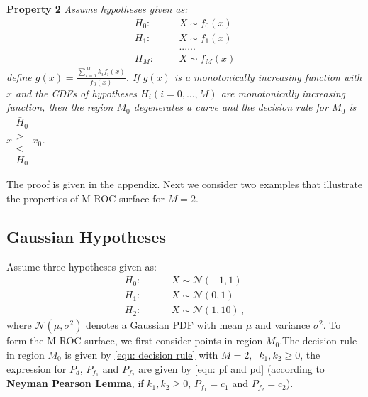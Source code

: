 \documentclass[12pt,journal,a4paper,twoside,doublecolumn]{IEEEtran}
\begin{document}
\begin{spacing}{1.0}
\noindent \textbf{Property 2}
\noindent \textit{
  \noindent Assume hypotheses given as:
}
\begin{equation}
\begin{split}
H_0:\;\;\;\;\;\;&X \sim f_0(x)\\
H_1:\;\;\;\;\;\;&X \sim f_1(x)\\
  &......\\
H_M:\;\;\;\;\;\;&X \sim f_M(x)
\end{split}
\end{equation}
\textit{
  define $g(x) = \frac{\sum_{i=1}^{M}k_if_i(x)}{f_0(x)}$. If $g(x)$ is a monotonically increasing function with $x$ and the CDFs of hypotheses $H_i (i = 0, ..., M)$ are monotonically increasing function, then the region $M_0$ degenerates a curve and the decision rule for $M_0$ is $x \substack{\bar{H}_0 \\ \geq \\ < \\H_0} x_0$. 
}

The proof is given in the appendix.
Next we consider two examples that illustrate the properties of M-ROC surface for $M = 2$.

\subsection{Gaussian Hypotheses}
Assume three hypotheses given as:
\begin{equation}
\label{equ: Gaussian Hypothesis}
\begin{split}
	H_0:\;\;\;\;\;\;\;\;&X \sim \mathcal{N}(-1,1)\\
    H_1:\;\;\;\;\;\;\;\;&X \sim \mathcal{N}(0,1)\\
    H_2:\;\;\;\;\;\;\;\;&X \sim \mathcal{N}(1,10)\,,
\end{split}
\end{equation}
where $\mathcal{N}(\mu,\sigma^2)$ denotes a Gaussian PDF with mean $\mu$ and variance $\sigma^2$.
To form the M-ROC surface, we first consider points in region $M_0$.The decision rule in region $M_0$ is given by \eqref{equ: decision rule}
with $M=2,\;\;k_1, k_2 \geq 0$, the expression for $P_d$, $P_{f_1}$ and $P_{f_2}$ are given by \eqref{equ: pf and pd} (according to \textbf{Neyman Pearson Lemma}, if $k_1, k_2 \geq 0$, $P_{f_1} = c_1$ and $P_{f_2} = c_2$).


\end{spacing}
\end{document}
